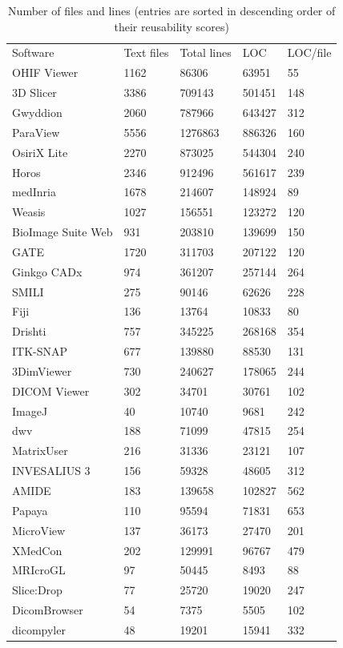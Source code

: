 \documentclass[final, 3p, times, authoryear]{elsarticle}
\begin{document}
\begin{table}[!ht]
\centering
\begin{tabular}{lllll}
\hline
\multirow{2}{*}{Software} & \multirow{2}{*}{Text files} & \multirow{2}{*}{Total lines} & \multirow{2}{*}{LOC} & \multirow{2}{*}{LOC/file} \\
 &  &  &  &  \\ \hline
OHIF Viewer & 1162 & 86306 & 63951 & 55 \\
3D Slicer & 3386 & 709143 & 501451 & 148 \\
Gwyddion & 2060 & 787966 & 643427 & 312 \\
ParaView & 5556 & 1276863 & 886326 & 160 \\
OsiriX Lite & 2270 & 873025 & 544304 & 240 \\
Horos & 2346 & 912496 & 561617 & 239 \\
medInria & 1678 & 214607 & 148924 & 89 \\
Weasis & 1027 & 156551 & 123272 & 120 \\
BioImage Suite Web & 931 & 203810 & 139699 & 150 \\
GATE & 1720 & 311703 & 207122 & 120 \\
Ginkgo CADx & 974 & 361207 & 257144 & 264 \\
SMILI & 275 & 90146 & 62626 & 228 \\
Fiji & 136 & 13764 & 10833 & 80 \\
Drishti & 757 & 345225 & 268168 & 354 \\
ITK-SNAP & 677 & 139880 & 88530 & 131 \\
3DimViewer & 730 & 240627 & 178065 & 244 \\
DICOM Viewer & 302 & 34701 & 30761 & 102 \\
ImageJ & 40 & 10740 & 9681 & 242 \\
dwv & 188 & 71099 & 47815 & 254 \\
MatrixUser & 216 & 31336 & 23121 & 107 \\
INVESALIUS 3 & 156 & 59328 & 48605 & 312 \\
AMIDE & 183 & 139658 & 102827 & 562 \\
Papaya & 110 & 95594 & 71831 & 653 \\
MicroView & 137 & 36173 & 27470 & 201 \\
XMedCon & 202 & 129991 & 96767 & 479 \\
MRIcroGL & 97 & 50445 & 8493 & 88 \\
Slice:Drop & 77 & 25720 & 19020 & 247 \\
DicomBrowser & 54 & 7375 & 5505 & 102 \\
dicompyler & 48 & 19201 & 15941 & 332 \\ \hline
\end{tabular}
\caption{Number of files and lines (entries are sorted in descending order of
their reusability scores)}
\label{tab_loc_per_file}
\end{table}
\end{document}
